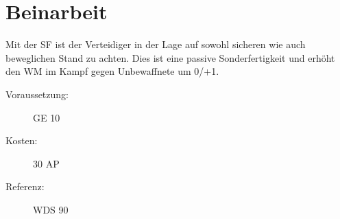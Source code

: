 \section{Beinarbeit}
\label{sf.beinarbeit}
Mit der SF  ist der Verteidiger in der Lage auf sowohl sicheren wie auch beweglichen Stand zu achten.
Dies ist eine passive Sonderfertigkeit und erhöht den WM im Kampf gegen Unbewaffnete um 0/+1.
\begin{description}
    \item[Voraussetzung:]
        GE 10
    \item [Kosten:]
        30 AP
    \item [Referenz:]
        WDS 90
\end{description}
